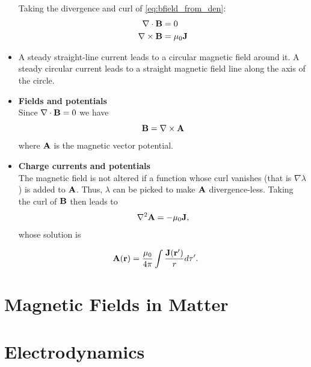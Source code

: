 \documentclass[oneside,a4paper,11pt]{report}
\begin{document}
\begin{itemize}
Taking the divergence and curl of \cref{eq:bfield_from_den}:
\begin{align}
\nabla \cdot \mathbf{B} &= 0 \\
\nabla \times \mathbf{B} &= \mu_0 \mathbf{J} \label{eq:amperes_law}
\end{align}


\item A steady straight-line current leads to a circular magnetic field around it. A steady circular current leads to a straight magnetic field line along the axis of the circle.

\item \textbf{Fields and potentials} \\
Since $\nabla \cdot \mathbf{B} = 0$  we have 
\begin{equation} \mathbf{B} = \nabla \times \mathbf{A} \end{equation}
where $\mathbf{A}$ is the magnetic vector potential. 

\item \textbf{Charge currents and potentials} \\
The magnetic field is not altered if a function whose curl vanishes (that is $\nabla \lambda$ ) is added to $\mathbf{A}$. Thus, $\lambda$ can be picked to make $\mathbf{A}$ divergence-less. Taking the curl of $\mathbf{B}$ then leads to 
\begin{equation}
\nabla^2 \mathbf{A} = -\mu_0 \mathbf{J}, 
\end{equation}
whose solution is
\end{itemize}
\begin{equation}
\mathbf{A}(\mathbf{r}) = \frac{\mu_0}{4 \pi } \int \frac{ \mathbf{J}(\mathbf{r}')}{r} d\tau'.
\end{equation}

\section{Magnetic Fields in Matter}

\section{Electrodynamics}

\end{document}
